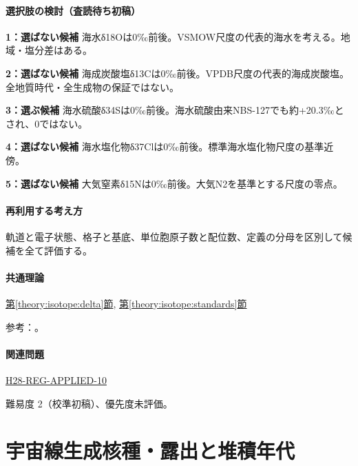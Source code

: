 \paragraph{選択肢の検討（査読待ち初稿）}\mbox{}\par

\noindent\textbf{1：選ばない候補} 海水δ18Oは0‰前後。VSMOW尺度の代表的海水を考える。地域・塩分差はある。\par

\noindent\textbf{2：選ばない候補} 海成炭酸塩δ13Cは0‰前後。VPDB尺度の代表的海成炭酸塩。全地質時代・全生成物の保証ではない。\par

\noindent\textbf{3：選ぶ候補} 海水硫酸δ34Sは0‰前後。海水硫酸由来NBS-127でも約+20.3‰とされ、0ではない。\par

\noindent\textbf{4：選ばない候補} 海水塩化物δ37Clは0‰前後。標準海水塩化物尺度の基準近傍。\par

\noindent\textbf{5：選ばない候補} 大気窒素δ15Nは0‰前後。大気N2を基準とする尺度の零点。\par

\paragraph{再利用する考え方} 軌道と電子状態、格子と基底、単位胞原子数と配位数、定義の分母を区別して候補を全て評価する。

\paragraph{共通理論} \hyperref[theory:isotope:delta]{第\ref*{theory:isotope:delta}節}, \hyperref[theory:isotope:standards]{第\ref*{theory:isotope:standards}節}

\par 参考：\cite{atomic_sulfate,iso_standards1995}。

\paragraph{関連問題} \hyperref[q:h28-reg-applied-10]{H28-REG-APPLIED-10}

\par 難易度 2（校準初稿）、優先度未評価。

\section{宇宙線生成核種・露出と堆積年代}

